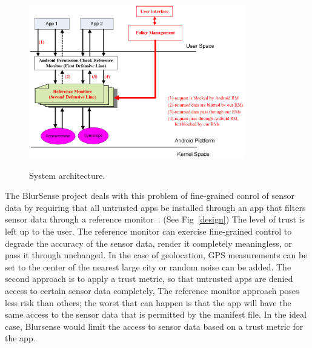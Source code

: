 \begin{figure}%
  \centering
  \includegraphics[width=3.7in]{refMonDesign.eps}\\
  \caption{System architecture.}
  \label{Fig:design}
\end{figure}

The BlurSense project deals with this problem of fine-grained conrol of sensor data
by requiring that all untrusted apps be installed
through an app that filters sensor data through a reference monitor~\cite{cappos-SAS14}.  
(See Fig~\ref{design})
The level of trust is left up to the user.  The reference
monitor can exercise fine-grained control to degrade the accuracy of the sensor data, render it 
completely meaningless, or pass it through unchanged.  
In the case of geolocation, GPS measurements can be set to the center of the nearest
large city or random noise can be added.  
The second approach is to apply a trust metric, so that untrusted apps are denied access to certain
sensor data completely,
The reference monitor approach poses less risk than others; the worst that can happen is
that the app will have the same access to the sensor data that
is permitted by the manifest file. In the ideal case, Blursense
would limit the access to sensor data based on a trust metric for the app.

